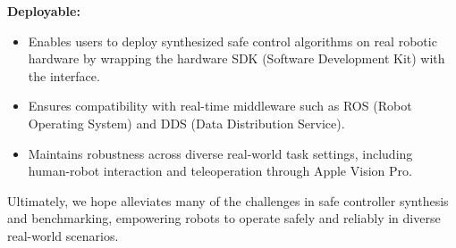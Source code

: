 \noindent\textbf{Deployable:}
\begin{itemize}
    \item Enables users to deploy synthesized safe control algorithms on real robotic hardware by wrapping the hardware SDK (Software Development Kit) with the \spark interface.
    \item Ensures compatibility with real-time middleware such as ROS (Robot Operating System) and DDS (Data Distribution Service).
    \item Maintains robustness across diverse real-world task settings, including human-robot interaction and teleoperation through Apple Vision Pro.
\end{itemize}


Ultimately, we hope \spark alleviates many of the challenges in safe controller synthesis and benchmarking, empowering robots to operate safely and reliably in diverse real-world scenarios.
